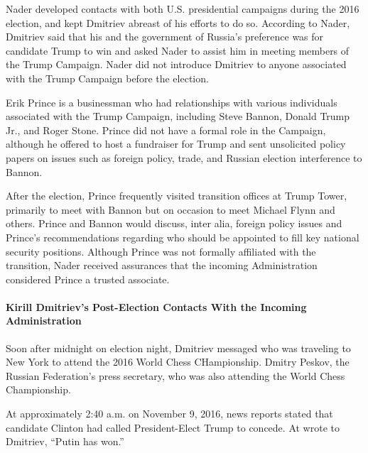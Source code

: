 Nader developed contacts with both U.S. presidential campaigns during the 2016 election, and kept Dmitriev abreast of his efforts to do so.%
According to Nader, Dmitriev said that his and the government of Russia's preference was for candidate Trump to win and asked Nader to assist him in meeting members of the Trump Campaign.%
Nader did not introduce Dmitriev to anyone associated with the Trump Campaign before the election.%


Erik Prince is a businessman who had relationships with various individuals associated with the Trump Campaign, including Steve Bannon, Donald Trump Jr., and Roger Stone.%
Prince did not have a formal role in the Campaign, although he offered to host a fundraiser for Trump and sent unsolicited policy papers on issues such as foreign policy, trade, and Russian election interference to Bannon.%

After the election, Prince frequently visited transition offices at Trump Tower, primarily to meet with Bannon but on occasion to meet Michael Flynn and others.%
Prince and Bannon would discuss, inter alia, foreign policy issues and Prince's recommendations regarding who should be appointed to fill key national security positions.%
Although Prince was not formally affiliated with the transition, Nader
received assurances
that the incoming Administration considered Prince a trusted associate.%

\paragraph{Kirill Dmitriev's Post-Election Contacts With the Incoming Administration}

Soon after midnight on election night, Dmitriev messaged
who was traveling to New York to attend the 2016 World Chess CHampionship.
Dmitry Peskov, the Russian Federation's press secretary, who was also attending the World Chess Championship.%

At approximately 2:40 a.m. on November 9, 2016, news reports stated that candidate Clinton had called President-Elect Trump to concede.
At
wrote to Dmitriev, ``Putin has won.''%

